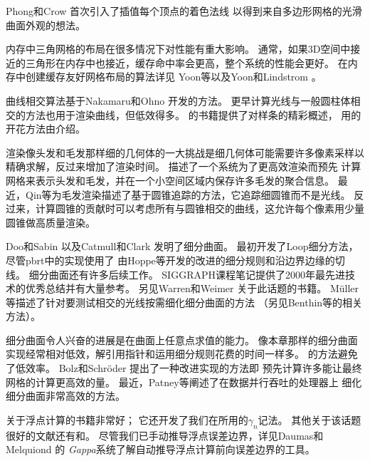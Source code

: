 Phong和Crow \parencite*{phong1975improved}首次引入了插值每个顶点的着色法线
以得到来自多边形网格的光滑曲面外观的想法。

内存中三角网格的布局在很多情况下对性能有重大影响。
通常，如果3D空间中接近的三角形在内存中也接近，缓存命中率会更高，整个系统的性能会更好。
在内存中创建缓存友好网格布局的算法详见
Yoon等\parencite*{10.1145/1186822.1073278}以及Yoon和Lindstrom \parencite*{4015484}。

曲线相交算法基于Nakamaru和Ohno \parencite*{Nakamaru_raytracing}开发的方法。
更早计算光线与一般圆柱体相交的方法也用于渲染曲线，但低效得多\citep{10.1145/6116.6118,DeVoogt2000197}。
\citet{10.5555/501891}的书籍提供了对样条的精彩概述，
用的开花方法由\citet{ramshaw1987blossoming}介绍。

渲染像头发和毛发那样细的几何体的一大挑战是细几何体可能需要许多像素采样以精确求解，反过来增加了渲染时间。
\citet{10.1145/1179849.1179904}描述了一个系统为了更高效渲染而预先
计算网格来表示头发和毛发，并在一个小空间区域内保存许多毛发的聚合信息。
最近，Qin等\parencite*{6684531}为毛发渲染描述了基于圆锥追踪的方法，它追踪细圆锥而不是光线。
反过来，计算圆锥的贡献时可以考虑所有与圆锥相交的曲线，这允许每个像素用少量圆锥做高质量渲染。

Doo和Sabin \parencite*{DOO1978356}以及Catmull和Clark \parencite*{CATMULL1978350}发明了细分曲面。
\citet{loop1987smooth}最初开发了Loop细分方法，尽管pbrt中的实现使用了
由Hoppe等\parencite*{10.1145/192161.192233}开发的改进的细分规则和沿边界边缘的切线。
细分曲面还有许多后续工作。
SIGGRAPH课程笔记提供了2000年最先进技术的优秀总结并有大量参考\citep{zorin2000subdivision}。
另见Warren和Weimer \parencite*{WARREN20021}关于此话题的书籍。
Müller等\parencite*{10.1111/1467-8659.t01-2-00703}描述了针对要测试相交的光线按需细化细分曲面的方法
（另见Benthin等\parencite*{SCI:Ben2007a}的相关方法）。

细分曲面令人兴奋的进展是在曲面上任意点求值的能力\citep{10.1145/280814.280945}。
像本章那样的细分曲面实现经常相对低效，解引用指针和运用细分规则花费的时间一样多。
\citeauthor{10.1145/280814.280945}的方法避免了低效率。
Bolz和Schröder \parencite*{10.1145/504502.504505}提出了一种改进实现的方法即
预先计算许多能让最终网格的计算更高效的量。
最近，Patney等\parencite*{10.1145/1572769.1572785}阐述了在数据并行吞吐的处理器上
细化细分曲面非常高效的方法。

\citet{doi:10.1137/1.9780898718027}关于浮点计算的书籍非常好；
它还开发了我们在所用的$\gamma_n$记法。
其他关于该话题很好的文献还有\citet{10.5555/1096474}和\citet{10.1145/103162.103163}。
尽管我们已手动推导浮点误差边界，详见Daumas和Melquiond \parencite*{10.1145/1644001.1644003}的
\emph{Gappa}系统了解自动推导浮点计算前向误差边界的工具。

